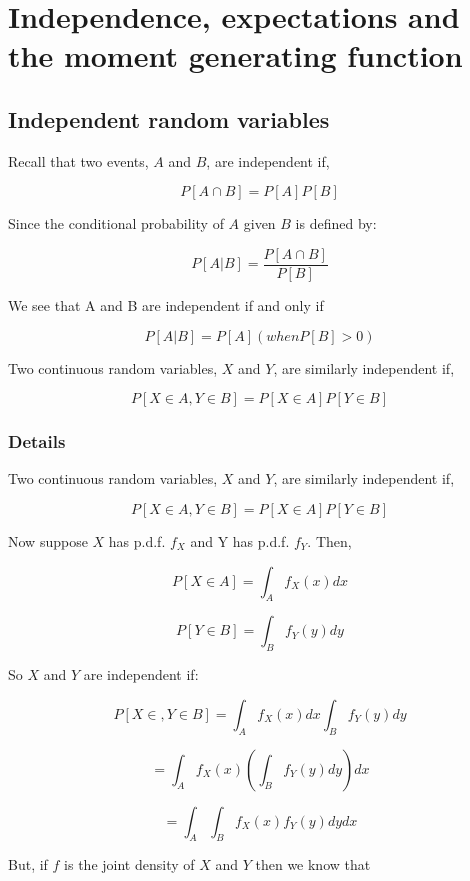 \documentclass[12pt,a4paper]{article}
\theoremstyle{regla}
\theoremstyle{remark}
\theoremstyle{definition}
\theoremstyle{nonumberbreak}
\begin{document}
\section{Independence, expectations and the moment generating function}
\subsection{Independent random variables}
\begin{fbox}
\begin{minipage}{0.97\textwidth}
Recall that two events, $A$ and $B$, are independent if,

$$ P [A \cap B] = P[A] P[B] $$

Since the conditional probability of $A$ given $B$ is defined by:

$$ P [A|B] = \frac {P [A \cap B]} {P[B]}$$

We see that A and B are independent if and only if

$$ P[A|B] = P[A](when  P [B] > 0 )$$

 

Two continuous random variables, $X$ and $Y$, are similarly independent if,

$$ P [X \in A, Y \in B] = P [X \in A] P[Y \in B] $$

\end{minipage}
\end{fbox}
\subsubsection{Details}
Two continuous random variables, $X$ and $Y$, are similarly independent if,

$$ P [X \in A, Y \in B] = P [X \in A] P[Y \in B] $$

Now suppose $X$ has p.d.f. $f_X$  and Y has p.d.f. $f_Y$. Then,

$$ P [X \in A] = \int_{A} f_X (x) dx $$

$$ P [Y \in B] = \int_{B} f_Y (y) dy $$

So $X$ and $Y$ are independent if:

$$ P [X \in , Y \in B] = \int_{A} f_X (x) dx \int_{B} f_Y (y) dy $$

$$ = \int_{A}f_X (x) (\int_{B} f_Y (y) dy) dx$$

$$ = \int_{A}\int_{B} f_X (x)f_Y (y) dydx $$

But, if $f$ is the joint density of $X$ and $Y$ then we know that
\end{document}
